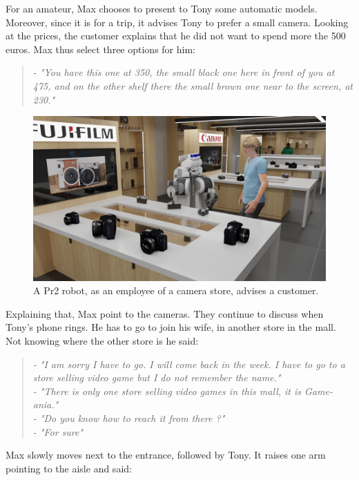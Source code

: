 For an amateur, Max chooses to present to Tony some automatic models. Moreover, since it is for a trip, it advises Tony to prefer a small camera. Looking at the prices, the customer explains that he did not want to spend more the 500 euros. Max thus select three options for him:

\begin{quote} 
\centering 
\textit{
- "You have this one at 350, the small black one here in front of you at 475, and on the other shelf there the small brown one near to the screen, at 230." }
\end{quote}

\begin{figure}[h!]
\centering
\includegraphics[width=\textwidth]{figures/introduction/camera_store_2.png}
\caption{\label{fig:cam_store} A Pr2 robot, as an employee of a camera store, advises a customer. }
\end{figure}

Explaining that, Max point to the cameras. They continue to discuss when Tony's phone rings. He has to go to join his wife, in another store in the mall. Not knowing where the other store is he said:

\begin{quote} 
\centering 
\textit{
- "I am sorry I have to go. I will come back in the week. I have to go to a store selling video game but I do not remember the name." \\
- "There is only one store selling video games in this mall, it is Game-ania." \\
- "Do you know how to reach it from there ?" \\
- "For sure"}
\end{quote}

Max slowly moves next to the entrance, followed by Tony. It raises one arm pointing to the aisle and said:

